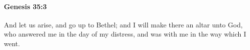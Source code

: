 
		\paragraph{Genesis 35:3} %
			\label{GENESIS-35-3}

			And let us arise, and go up to Bethel; and I will make there an altar unto God, who answered me in the day of my distress, and was with me in the way which I went.


